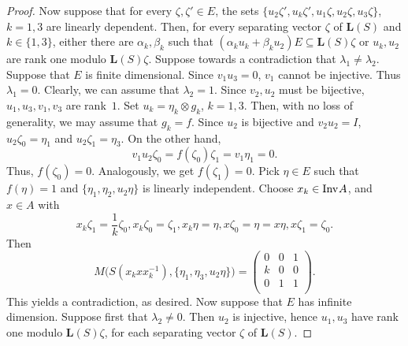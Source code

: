\documentclass[a4paper,12pt,reqno]{amsart}
\numberwithin{equation}{section}
\theoremstyle{definition}
\begin{document}
\begin{proof}
Now suppose that for every $\zeta, \zeta' \in E$, the sets $\{ u_2 \zeta', u_k \zeta', u_1 \zeta, u_2 \zeta, u_3 \zeta\}$, $k=1,3$
are linearly dependent. Then, for every separating vector $\zeta$ of ${{\bm L(S)}}$ and $k \in \{1,3\}$, either there are
$\alpha_k, \beta_k$ such that $(\alpha_k u_k + \beta_k u_2 )E \subseteq {{\bm L(S)}} \zeta$ or
$u_k, u_2$ are rank one modulo ${{\bm L(S)}}\zeta$.  Suppose towards a contradiction that $\lambda_1\neq\lambda_2$.
Suppose that $E$ is finite dimensional. Since $v_1u_3 =0$, $v_1$ cannot be injective. Thus $\lambda_1=0$.
Clearly, we can assume that $\lambda_2=1$. Since $v_2, u_2$ must be bijective, $u_1, u_3, v_1, v_3$ are rank~$1$.
Set $u_k= \eta_k \otimes g_k$, $k=1,3$. Then, with no loss of generality, we may assume that $g_k=f$.
Since $u_2$ is bijective and $v_2u_2= I$, $u_2\zeta_0=\eta_1$ and $u_2\zeta_1=\eta_3$.  On the other hand,
\begin{equation*}
v_1u_2 \zeta_0= f(\zeta_0) \zeta_1= v_1 \eta_1=0.
\end{equation*}
Thus, $f(\zeta_0)=0$.  Analogously, we get $f(\zeta_1)=0$. Pick $\eta\in E$ such that $f(\eta)=1$ and $\{\eta_1, \eta_2, u_2 \eta\}$
is linearly independent. Choose $x_k \in{{\textup{Inv}\kern.5pt A}}$, and $x \in A$ with
\begin{equation*}
x_k \zeta_1= \frac{1}{k} \zeta_0, x_k \zeta_0= \zeta_1, x_k \eta=\eta, x \zeta_0= \eta= x \eta, x \zeta_1= \zeta_0.
\end{equation*}
Then
\begin{equation*}
M\bigl( {S} (x_k x x_k^{-1}), \{\eta_1, \eta_3, u_2 \eta\}\bigr)= \left(
                                                           \begin{array}{ccc}
                                                             0 & 0 & 1 \\
                                                             k & 0 & 0 \\
                                                             0 & 1 & 1 \\
                                                           \end{array}
                                                         \right).
\end{equation*}
This yields a contradiction, as desired. Now suppose that $E$ has infinite dimension. Suppose first that $\lambda_2\neq 0$.
Then $u_2$ is injective, hence $u_1, u_3$ have rank one modulo ${{\bm L(S)}} \zeta$, for each separating vector $\zeta$ of ${{\bm L(S)}}$.

\end{proof}
\end{document}
